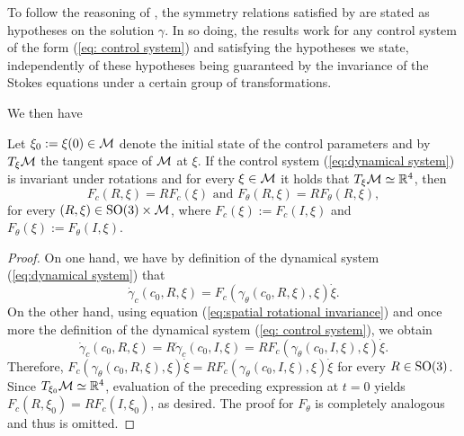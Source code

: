 \begin{remark}
To follow the reasoning of \cite{Alouges2017}, the symmetry relations satisfied by \spr are stated as hypotheses on the solution $\gamma$. In so doing, the results work for any control system of the form (\ref{eq: control system}) and satisfying the hypotheses we state, independently of these hypotheses being guaranteed by the invariance of the Stokes equations under a certain group of transformations. 
\end{remark}
We then have
\begin{proposition}
\label{prop: rotational invariance}
Let $\xi_0 := \xi(0) \in \mathcal{M}$ denote the initial state of the control parameters and by $T_{\xi}\mathcal{M}$ the tangent space of $\mathcal{M}$ at $\xi$. If the control system (\ref{eq:dynamical system}) is invariant under rotations and for every $\xi \in \mathcal{M}$ it holds that $T_{\xi} \mathcal{M} \simeq \mathbb{R}^4$, then
\begin{equation}
	F_c(R, \xi) = R F_c(\xi) \text { and } F_\theta(R, \xi) = R F_{\theta} (R, \xi),
\end{equation}
for every $(R, \xi) \in \operatorname{SO}(3) \times \mathcal{M}$, where $F_c(\xi) := F_{c}(I, \xi)$ and $F_{\theta}(\xi) := F_{\theta}(I, \xi)$. 
\end{proposition}

\begin{proof}
On one hand, we have by definition of the dynamical system (\ref{eq:dynamical system}) that
\begin{equation}
	\dot{\gamma}_c(c_0, R, \xi) = F_c(\gamma_{\theta}(c_0, R, \xi), \xi) \dot{\xi}.
\end{equation}
On the other hand, using equation (\ref{eq:spatial rotational invariance}) and once more the definition of the dynamical system (\ref{eq: control system}), we obtain
\begin{equation}
	\dot{\gamma}_c (c_0, R, \xi) = R  \dot{\gamma}_c(c_0, I, \xi) = 
	R F_c(\gamma_{\theta}(c_0, I, \xi), \xi) \dot{\xi}.
\end{equation}
Therefore, $F_c(\gamma_{\theta}(c_0, R, \xi), \xi) \dot{\xi} = R F_{c}(\gamma_{\theta}(c_0, I, \xi), \xi) \dot{\xi}$ for every $R \in \operatorname{SO}(3)$. Since $T_{\xi_0} \mathcal{M} \simeq \mathbb{R}^4$, evaluation of the preceding expression at $t = 0$ yields $F_{c}(R, \xi_0) = R F_{c}(I, \xi_0)$, as desired. The proof for $F_{\theta}$ is completely analogous and thus is omitted.
\end{proof}
